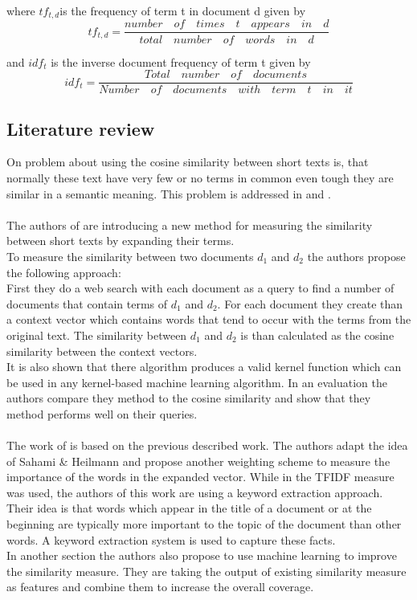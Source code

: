 where $tf_{t,d}$is the  frequency of term t in document d given by
\begin{equation}
tf_{t,d} = \dfrac{number \quad  of \quad  times \quad   t \quad  appears \quad  in \quad   d}{total \quad number  \quad  of \quad  words \quad  in \quad  d}
\end{equation}

and $idf_{t}$ is the inverse document frequency of term t given by
\begin{equation}
idf_{t} = \dfrac{Total \quad number \quad  of  \quad documents}{Number \quad  of \quad  documents \quad  with \quad  term \quad t \quad  in  \quad it}
\end{equation}

\subsection{Literature review}
On problem about using the cosine similarity between short texts is, that normally these text have very few  or no terms in common even tough they are similar in a semantic meaning. This problem is addressed in \cite{similarity1} and \cite{similarity2}. \\
~\\
The authors of \cite{similarity1} are introducing a new method for measuring the similarity between short texts by expanding their terms. \\
To measure the similarity between two documents $d_1$ and $d_2$ the authors propose the following approach: \\
First they do a web search with each document as a query to find a number of documents that contain terms of $d_1$ and $d_2$. For each document they create than a context vector which contains words that tend to occur with the terms from the original text. The similarity between $d_1$ and $d_2$ is than calculated as the cosine similarity between the context vectors. \\
It is also shown that there algorithm produces a valid kernel function which can be used in any kernel-based machine learning algorithm. In an evaluation the authors compare they method to the cosine similarity and show that they method performs well on their queries. \\
~\\
The work of \cite{similarity2} is based on the previous described work. The authors adapt the idea of Sahami \& Heilmann and propose another weighting scheme to measure the importance of the words in the expanded vector. While in \cite{similarity1} the TFIDF measure was used, the authors of this work are using a keyword extraction approach. Their idea is that words which appear in the title of a document or at the beginning are typically more important to the topic of the document than other words. A keyword extraction system is used to capture these facts. \\
In another section the authors also propose to use machine learning to improve the similarity measure. They are taking the output of existing similarity measure as features and combine them to increase the overall coverage. 


